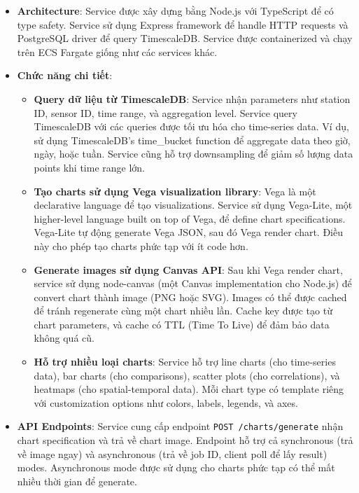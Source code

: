 \begin{itemize}
    \item \textbf{Architecture}: Service được xây dựng bằng Node.js với TypeScript để có type safety. Service sử dụng Express framework để handle HTTP requests và PostgreSQL driver để query TimescaleDB. Service được containerized và chạy trên ECS Fargate giống như các services khác.
    
    \item \textbf{Chức năng chi tiết}:
        \begin{itemize}
            \item \textbf{Query dữ liệu từ TimescaleDB}: Service nhận parameters như station ID, sensor ID, time range, và aggregation level. Service query TimescaleDB với các queries được tối ưu hóa cho time-series data. Ví dụ, sử dụng TimescaleDB's time\_bucket function để aggregate data theo giờ, ngày, hoặc tuần. Service cũng hỗ trợ downsampling để giảm số lượng data points khi time range lớn.
            
            \item \textbf{Tạo charts sử dụng Vega visualization library}: Vega là một declarative language để tạo visualizations. Service sử dụng Vega-Lite, một higher-level language built on top of Vega, để define chart specifications. Vega-Lite tự động generate Vega JSON, sau đó Vega render chart. Điều này cho phép tạo charts phức tạp với ít code hơn.
            
            \item \textbf{Generate images sử dụng Canvas API}: Sau khi Vega render chart, service sử dụng node-canvas (một Canvas implementation cho Node.js) để convert chart thành image (PNG hoặc SVG). Images có thể được cached để tránh regenerate cùng một chart nhiều lần. Cache key được tạo từ chart parameters, và cache có TTL (Time To Live) để đảm bảo data không quá cũ.
            
            \item \textbf{Hỗ trợ nhiều loại charts}: Service hỗ trợ line charts (cho time-series data), bar charts (cho comparisons), scatter plots (cho correlations), và heatmaps (cho spatial-temporal data). Mỗi chart type có template riêng với customization options như colors, labels, legends, và axes.
        \end{itemize}
    
    \item \textbf{API Endpoints}: Service cung cấp endpoint \texttt{POST /charts/generate} nhận chart specification và trả về chart image. Endpoint hỗ trợ cả synchronous (trả về image ngay) và asynchronous (trả về job ID, client poll để lấy result) modes. Asynchronous mode được sử dụng cho charts phức tạp có thể mất nhiều thời gian để generate.
    

\end{itemize}
